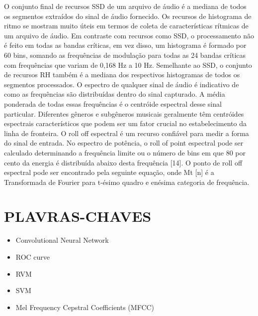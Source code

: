 \documentclass{article}
\begin{document}
O conjunto final de recursos SSD de um arquivo de áudio é a mediana de todos os segmentos extraídos do sinal de áudio fornecido.
Os recursos de histograma de ritmo se mostram muito úteis em termos de coleta de características rítmicas de um arquivo de áudio. 
Em contraste com recursos como SSD, o processamento não é feito em todas as bandas críticas, em vez disso, um histograma é formado por 60 bins, somando as frequências de modulação para todas as 24 bandas críticas com frequências que variam de 0,168 Hz a 10 Hz. Semelhante ao SSD, o conjunto de recursos RH também é a mediana dos respectivos histogramas de todos os segmentos processados.
O espectro de qualquer sinal de áudio é indicativo de como as frequências são distribuídas dentro do sinal capturado. 
A média ponderada de todas essas frequências é o centróide espectral desse sinal particular. 
Diferentes gêneros e subgêneros musicais geralmente têm centróides espectrais característicos que podem ser um fator crucial no estabelecimento da linha de fronteira.
O roll off espectral é um recurso confiável para medir a forma do sinal de entrada. No espectro de potência, o roll of point espectral pode ser calculado determinando a frequência limite ou o número de bins em que 80 por cento da energia é distribuída abaixo desta frequência [14]. 
O ponto de roll off espectral pode ser encontrado pela seguinte equação, onde Mt [n] é a Transformada de Fourier para t-ésimo quadro e enésima categoria de frequência.

\section{PLAVRAS-CHAVES}
\begin{itemize}
    \item Convolutional Neural Network
    \item ROC curve
    \item RVM
    \item SVM
    \item Mel Frequency Cepstral Coefficients (MFCC)
\end{itemize}
\end{document}
